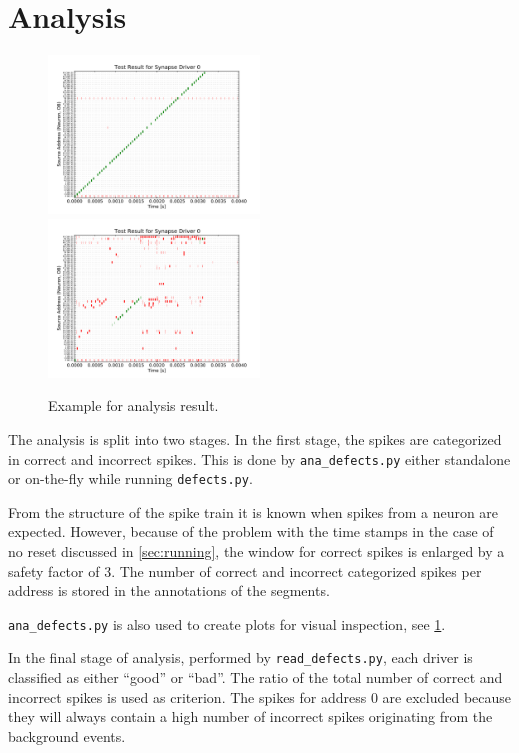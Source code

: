 \documentclass[a4paper]{article}
\newcommand{\pkg}[1]{\lstinline+#1+}
\begin{document}
\section{Analysis}

\begin{figure}
  \centering
  \includegraphics[width=0.5\textwidth]{figures/defects_bus_0_hline_62_vline_191_drv_0_w1_h288_f100_bkgisi10000_20140911_0.88_1.05}%
  \includegraphics[width=0.5\textwidth]{figures/defects_bus_0_hline_62_vline_191_drv_0_w1_h288_f100_bkgisi10000_20140911_0.50_0.70}
  \caption{Example for analysis result.}
  \label{fig:ana_example}
\end{figure}

The analysis is split into two stages. In the first stage, the spikes
are categorized in correct and incorrect spikes. This is done by
\pkg{ana_defects.py} either standalone or on-the-fly while running
\pkg{defects.py}.


From the structure of the spike train it is known when spikes from a
neuron are expected. However, because of the problem with the time
stamps in the case of no reset discussed in \cref{sec:running}, the
window for correct spikes is enlarged by a safety factor of 3. The
number of correct and incorrect categorized spikes per address is
stored in the annotations of the segments.

\pkg{ana_defects.py} is also used to create plots
for visual inspection, see \cref{fig:ana_example}.

In the final stage of analysis, performed by \pkg{read_defects.py},
each driver is classified as either ``good'' or ``bad''. The ratio of
the total number of correct and incorrect spikes is used as
criterion. The spikes for address 0 are excluded because they will
always contain a high number of incorrect spikes originating from the
background events.
\end{document}
